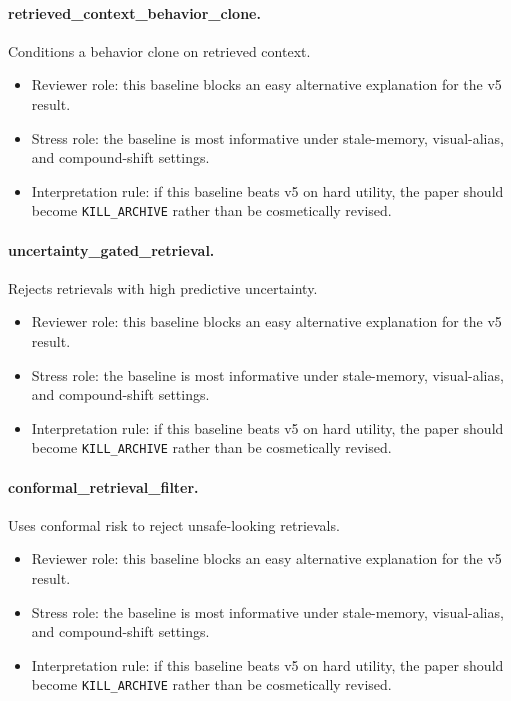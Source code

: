 \documentclass{article}
\begin{document}
\paragraph{retrieved\_context\_behavior\_clone.} Conditions a behavior clone on retrieved context.
\begin{itemize}
\item Reviewer role: this baseline blocks an easy alternative explanation for the v5 result.
\item Stress role: the baseline is most informative under stale-memory, visual-alias, and compound-shift settings.
\item Interpretation rule: if this baseline beats v5 on hard utility, the paper should become \texttt{KILL\_ARCHIVE} rather than be cosmetically revised.
\end{itemize}
\paragraph{uncertainty\_gated\_retrieval.} Rejects retrievals with high predictive uncertainty.
\begin{itemize}
\item Reviewer role: this baseline blocks an easy alternative explanation for the v5 result.
\item Stress role: the baseline is most informative under stale-memory, visual-alias, and compound-shift settings.
\item Interpretation rule: if this baseline beats v5 on hard utility, the paper should become \texttt{KILL\_ARCHIVE} rather than be cosmetically revised.
\end{itemize}
\paragraph{conformal\_retrieval\_filter.} Uses conformal risk to reject unsafe-looking retrievals.
\begin{itemize}
\item Reviewer role: this baseline blocks an easy alternative explanation for the v5 result.
\item Stress role: the baseline is most informative under stale-memory, visual-alias, and compound-shift settings.
\item Interpretation rule: if this baseline beats v5 on hard utility, the paper should become \texttt{KILL\_ARCHIVE} rather than be cosmetically revised.
\end{itemize}
\end{document}
